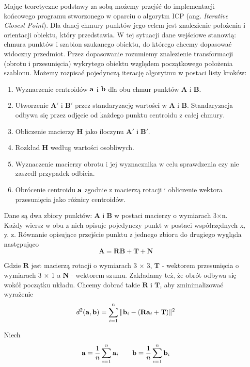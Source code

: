 \documentclass{article}
\begin{document}
Mając teoretyczne podstawy za sobą możemy przejść do implementacji końcowego programu stworzonego w oparciu o algorytm ICP (ang. \emph{Iterative Closest Point}). Dla danej chmury punktów jego celem jest znalezienie położenia i orientacji obiektu, który przedstawia. W tej sytuacji dane wejściowe stanowią: chmura punktów i szablon szukanego obiektu, do którego chcemy dopasować widoczny przedmiot. Przez dopasowanie rozumiemy znalezienie transformacji (obrotu i przesunięcia) wykrytego obiektu względem początkowego położenia szablonu. Możemy rozpisać pojedynczą iterację algorytmu w postaci listy kroków:

\begin{enumerate}
\item Wyznaczenie centroidów $\vb{a}$ i $\vb{b}$ dla obu chmur punktów $\mathbf{A}$ i $\mathbf{B}$.
\item Utworzenie $\mathbf{A'}$ i $\mathbf{B'}$ przez standaryzację wartości w $\mathbf{A}$ i $\mathbf{B}$. Standaryzacja odbywa się przez odjęcie od każdego punktu centroidu z całej chmury.
\item Obliczenie macierzy $\mathbf{H}$ jako iloczynu $\mathbf{A'}$ i $\mathbf{B'}$.
\item Rozkład $\mathbf{H}$ według wartości osobliwych.
\item Wyznaczenie macierzy obrotu i jej wyznacznika w celu sprawdzenia czy nie zaszedł przypadek odbicia.
\item Obrócenie centroidu $\vb{a}$ zgodnie z macierzą rotacji i obliczenie wektora przesunięcia jako różnicy centroidów. 
\end{enumerate}

Dane są dwa zbiory punktów: $\mathbf{A}$ i $\mathbf{B}$ w postaci macierzy o wymiarach 3$\times$n. Każdy wiersz w obu z nich opisuje pojedynczy punkt w postaci współrzędnych x, y, z. Równanie opisujące przejście punktu z jednego zbioru do drugiego wygląda następująco
\[\mathbf{A = R B + T + N} \]

Gdzie $\mathbf{R}$ jest macierzą rotacji o wymiarach 3 $\times$ 3, $\mathbf{T}$ - wektorem przesunięcia o wymiarach 3 $\times$ 1 a $\mathbf{N}$ - wektorem szumu. Zakładamy też, że obrót odbywa się wokół początku układu. Chcemy dobrać takie $\mathbf{R}$ i $\mathbf{T}$, aby zminimalizować wyrażenie
\[d^2(\vb{a}, \vb{b}) = \sum_{i=1}^n \| \vb{b}_{i} - (\mathbf{R} \vb{a}_i + \mathbf{T})\|^2 \]

Niech 
\[\vb{a} = \frac{1}{n} \sum_{i=1}^n \vb{a}_i \qquad \vb{b} = \frac{1}{n} \sum_{i=1}^n \vb{b}_i \]
\end{document}
